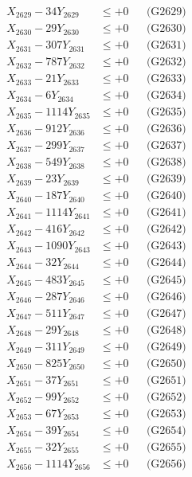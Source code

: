 \documentclass[a4paper,10pt]{article}
\begin{document}
{\begin{align}
X_{2629} - 34Y_{2629} &\leq +0 && \text{(G2629)} \\
X_{2630} - 29Y_{2630} &\leq +0 && \text{(G2630)} \\
\allowbreak
X_{2631} - 307Y_{2631} &\leq +0 && \text{(G2631)} \\
X_{2632} - 787Y_{2632} &\leq +0 && \text{(G2632)} \\
X_{2633} - 21Y_{2633} &\leq +0 && \text{(G2633)} \\
X_{2634} - 6Y_{2634} &\leq +0 && \text{(G2634)} \\
X_{2635} - 1114Y_{2635} &\leq +0 && \text{(G2635)} \\
X_{2636} - 912Y_{2636} &\leq +0 && \text{(G2636)} \\
X_{2637} - 299Y_{2637} &\leq +0 && \text{(G2637)} \\
X_{2638} - 549Y_{2638} &\leq +0 && \text{(G2638)} \\
X_{2639} - 23Y_{2639} &\leq +0 && \text{(G2639)} \\
X_{2640} - 187Y_{2640} &\leq +0 && \text{(G2640)} \\
\allowbreak
X_{2641} - 1114Y_{2641} &\leq +0 && \text{(G2641)} \\
X_{2642} - 416Y_{2642} &\leq +0 && \text{(G2642)} \\
X_{2643} - 1090Y_{2643} &\leq +0 && \text{(G2643)} \\
X_{2644} - 32Y_{2644} &\leq +0 && \text{(G2644)} \\
X_{2645} - 483Y_{2645} &\leq +0 && \text{(G2645)} \\
X_{2646} - 287Y_{2646} &\leq +0 && \text{(G2646)} \\
X_{2647} - 511Y_{2647} &\leq +0 && \text{(G2647)} \\
X_{2648} - 29Y_{2648} &\leq +0 && \text{(G2648)} \\
X_{2649} - 311Y_{2649} &\leq +0 && \text{(G2649)} \\
X_{2650} - 825Y_{2650} &\leq +0 && \text{(G2650)} \\
\allowbreak
X_{2651} - 37Y_{2651} &\leq +0 && \text{(G2651)} \\
X_{2652} - 99Y_{2652} &\leq +0 && \text{(G2652)} \\
X_{2653} - 67Y_{2653} &\leq +0 && \text{(G2653)} \\
X_{2654} - 39Y_{2654} &\leq +0 && \text{(G2654)} \\
X_{2655} - 32Y_{2655} &\leq +0 && \text{(G2655)} \\
X_{2656} - 1114Y_{2656} &\leq +0 && \text{(G2656)} \\

\end{align}}
\end{document}
